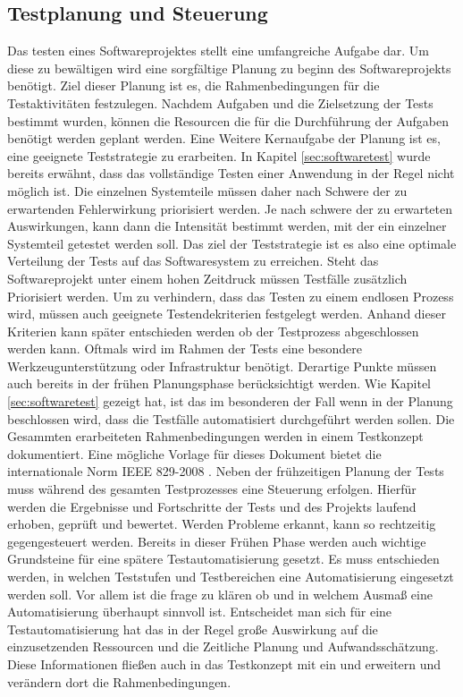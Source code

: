 \subsection{Testplanung und Steuerung}
\label{subsec:testplanung_und_steuerung}
Das testen eines Softwareprojektes stellt eine umfangreiche Aufgabe dar. Um diese zu bewältigen wird eine sorgfältige Planung zu beginn des Softwareprojekts benötigt.
Ziel dieser Planung ist es, die Rahmenbedingungen für die Testaktivitäten festzulegen. Nachdem Aufgaben und die Zielsetzung der Tests bestimmt wurden, können die Resourcen die für die Durchführung der Aufgaben benötigt werden geplant werden. Eine Weitere Kernaufgabe der Planung ist es, eine geeignete Teststrategie zu erarbeiten. In Kapitel \ref{sec:softwaretest} wurde bereits erwähnt, dass das vollständige Testen einer Anwendung in der Regel nicht möglich ist. Die einzelnen Systemteile müssen daher nach Schwere der zu erwartenden Fehlerwirkung priorisiert werden. Je nach schwere der zu erwarteten Auswirkungen, kann dann die Intensität bestimmt werden, mit der ein einzelner Systemteil getestet werden soll. Das ziel der Teststrategie ist es also eine optimale Verteilung der Tests auf das Softwaresystem zu erreichen. Steht das Softwareprojekt unter einem hohen Zeitdruck müssen Testfälle zusätzlich Priorisiert werden.
Um zu verhindern, dass das Testen zu einem endlosen Prozess wird, müssen auch geeignete Testendekriterien festgelegt werden. Anhand dieser Kriterien kann später entschieden werden ob der Testprozess abgeschlossen werden kann.
Oftmals wird im Rahmen der Tests eine besondere Werkzeugunterstützung oder Infrastruktur benötigt. Derartige Punkte müssen auch bereits in der frühen Planungsphase berücksichtigt werden. Wie Kapitel \ref{sec:softwaretest} gezeigt hat, ist das im besonderen der Fall wenn in der Planung beschlossen wird, dass die Testfälle automatisiert durchgeführt werden sollen.
Die Gesammten erarbeiteten Rahmenbedingungen werden in einem Testkonzept dokumentiert.
Eine mögliche Vorlage für dieses Dokument bietet die internationale Norm IEEE 829-2008 \cite{ieee_ieee_2008}.
Neben der frühzeitigen Planung der Tests muss während des gesamten Testprozesses eine Steuerung erfolgen.
Hierfür werden die Ergebnisse und Fortschritte der Tests und des Projekts laufend erhoben, geprüft und bewertet. Werden Probleme erkannt, kann so rechtzeitig gegengesteuert werden.
Bereits in dieser Frühen Phase werden auch wichtige Grundsteine für eine spätere Testautomatisierung gesetzt. Es muss entschieden werden, in welchen Teststufen und Testbereichen eine Automatisierung eingesetzt werden soll. Vor allem ist die frage zu klären ob und in welchem Ausmaß eine Automatisierung überhaupt sinnvoll ist.
Entscheidet man sich für eine Testautomatisierung hat das in der Regel große Auswirkung auf die einzusetzenden Ressourcen und die Zeitliche Planung und Aufwandsschätzung.
Diese Informationen fließen auch in das Testkonzept mit ein und erweitern und verändern dort die Rahmenbedingungen. 

